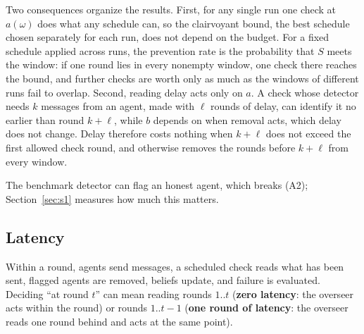 \documentclass[pdflatex,sn-mathphys-num]{sn-jnl}
\theoremstyle{thmstyleone}%
\begin{document}
Two consequences organize the results. First, for any single run one check at $a(\omega)$ does what any schedule can, so the clairvoyant bound, the best schedule chosen separately for each run, does not depend on the budget. For a fixed schedule applied across runs, the prevention rate is the probability that $S$ meets the window: if one round lies in every nonempty window, one check there reaches the bound, and further checks are worth only as much as the windows of different runs fail to overlap. Second, reading delay acts only on $a$. A check whose detector needs $k$ messages from an agent, made with $\ell$ rounds of delay, can identify it no earlier than round $k + \ell$, while $b$ depends on when removal acts, which delay does not change. Delay therefore costs nothing when $k + \ell$ does not exceed the first allowed check round, and otherwise removes the rounds before $k + \ell$ from every window.

The benchmark detector can flag an honest agent, which breaks (A2); Section~\ref{sec:s1} measures how much this matters.

\subsection{Latency}
Within a round, agents send messages, a scheduled check reads what has been sent, flagged agents are removed, beliefs update, and failure is evaluated. Deciding ``at round $t$'' can mean reading rounds $1..t$ (\textbf{zero latency}: the overseer acts within the round) or rounds $1..t{-}1$ (\textbf{one round of latency}: the overseer reads one round behind and acts at the same point).
\end{document}
